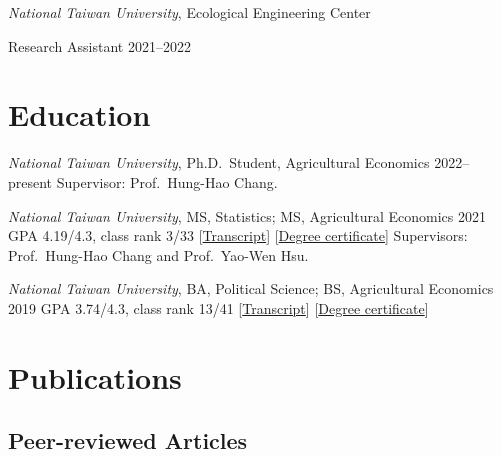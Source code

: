 \documentclass[11pt,letterpaper]{article}
\begin{document}
\emph{National Taiwan University}, Ecological Engineering Center

Research Assistant \hfill \mbox{2021--2022}

\hypertarget{education}{%
\section{Education}\label{education}}

\emph{National Taiwan University}, Ph.D.~Student, Agricultural Economics \hfill \mbox{2022--present} \newline Supervisor: Prof.~Hung-Hao Chang.

\emph{National Taiwan University}, MS, Statistics; MS, Agricultural Economics \hfill 2021 \newline GPA 4.19/4.3, class rank 3/33 {[}\href{https://yyliou.github.io/yyliou/cv/doc/ms-transcript.pdf}{Transcript}{]} {[}\href{https://yyliou.github.io/yyliou/cv/doc/ms-certificate.pdf}{Degree certificate}{]} \newline Supervisors: Prof.~Hung-Hao Chang and Prof.~Yao-Wen Hsu.

\emph{National Taiwan University}, BA, Political Science; BS, Agricultural Economics \hfill 2019 \newline GPA 3.74/4.3, class rank 13/41 {[}\href{https://yyliou.github.io/yyliou/cv/doc/bs-transcript.pdf}{Transcript}{]} {[}\href{https://yyliou.github.io/yyliou/cv/doc/bs-certificate.pdf}{Degree certificate}{]}

\hypertarget{publications}{%
\section{Publications}\label{publications}}

\hypertarget{peer-reviewed-articles}{%
\subsection{Peer-reviewed Articles}\label{peer-reviewed-articles}}
\end{document}

